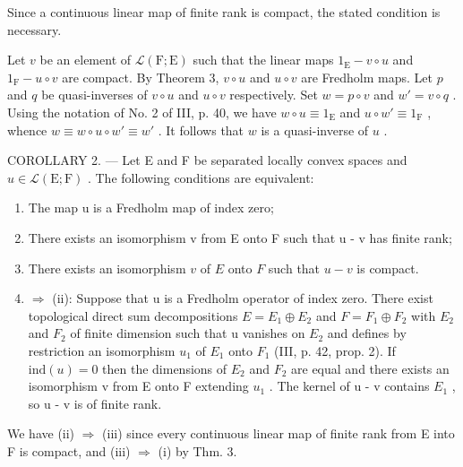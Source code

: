 Since a continuous linear map of finite rank is compact, the stated condition is necessary.

Let \(v\) be an element of \(\mathcal{L}(\mathrm{F};\mathrm{E})\) such that the linear maps \(1_{\mathrm{E}} - v \circ u\) and \(1_{\mathrm{F}} - u \circ v\) are compact. By Theorem 3, \(v \circ u\) and \(u \circ v\) are Fredholm maps. Let \(p\) and \(q\) be quasi-inverses of \(v \circ u\) and \(u \circ v\) respectively. Set \(w = p \circ v\) and \(w' = v \circ q\) . Using the notation of No. 2 of III, p. 40, we have \(w \circ u \equiv 1_{\mathrm{E}}\) and \(u \circ w' \equiv 1_{\mathrm{F}}\) , whence \(w \equiv w \circ u \circ w' \equiv w'\) . It follows that \(w\) is a quasi-inverse of \(u\) .

COROLLARY 2. --- Let E and F be separated locally convex spaces and \(u \in \mathcal{L}(\mathrm{E};\mathrm{F})\) . The following conditions are equivalent:

\begin{enumerate}
\def\labelenumi{(\roman{enumi})}
\item
  The map u is a Fredholm map of index zero;
\item
  There exists an isomorphism v from E onto F such that u - v has finite rank;
\item
  There exists an isomorphism \(v\) of \(E\) onto \(F\) such that \(u - v\) is compact.
\item
  \(\Longrightarrow\) (ii): Suppose that u is a Fredholm operator of index zero. There exist topological direct sum decompositions \(E = E_{1} \oplus E_{2}\) and \(F = F_{1} \oplus F_{2}\) with \(E_{2}\) and \(F_{2}\) of finite dimension such that u vanishes on \(E_{2}\) and defines by restriction an isomorphism \(u_{1}\) of \(E_{1}\) onto \(F_{1}\) (III, p. 42, prop. 2). If \(\text{ind}(u) = 0\) then the dimensions of \(E_{2}\) and \(F_{2}\) are equal and there exists an isomorphism v from E onto F extending \(u_{1}\) . The kernel of u - v contains \(E_{1}\) , so u - v is of finite rank.
\end{enumerate}

We have (ii) \(\Longrightarrow\) (iii) since every continuous linear map of finite rank from E into F is compact, and (iii) \(\Longrightarrow\) (i) by Thm. 3.

